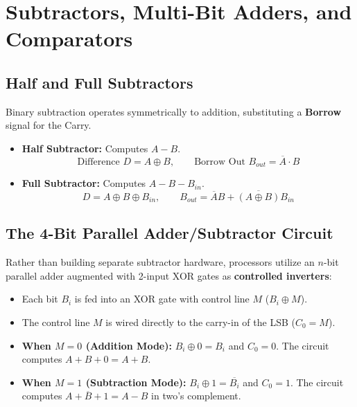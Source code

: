 \section{Subtractors, Multi-Bit Adders, and Comparators}
\label{sec:arithmetic_circuits}

\subsection{Half and Full Subtractors}
Binary subtraction operates symmetrically to addition, substituting a \textbf{Borrow} signal for the Carry.
\begin{itemize}
    \item \textbf{Half Subtractor:} Computes $A - B$.
    \begin{equation}
    \label{eq:half_subtractor}
    \text{Difference } D = A \oplus B, \qquad \text{Borrow Out } B_{out} = \overline{A} \cdot B
    \end{equation}
    \item \textbf{Full Subtractor:} Computes $A - B - B_{in}$.
    \begin{equation}
    \label{eq:full_subtractor}
    D = A \oplus B \oplus B_{in}, \qquad B_{out} = \overline{A}B + \overline{(A \oplus B)}B_{in}
    \end{equation}
\end{itemize}

\subsection{The 4-Bit Parallel Adder/Subtractor Circuit}
Rather than building separate subtractor hardware, processors utilize an $n$-bit parallel adder augmented with 2-input XOR gates as \textbf{controlled inverters}:
\begin{itemize}
    \item Each bit $B_i$ is fed into an XOR gate with control line $M$ ($B_i \oplus M$).
    \item The control line $M$ is wired directly to the carry-in of the LSB ($C_0 = M$).
    \item \textbf{When $M = 0$ (Addition Mode):} $B_i \oplus 0 = B_i$ and $C_0 = 0$. The circuit computes $A + B + 0 = A + B$.
    \item \textbf{When $M = 1$ (Subtraction Mode):} $B_i \oplus 1 = \overline{B_i}$ and $C_0 = 1$. The circuit computes $A + \overline{B} + 1 = A - B$ in two's complement.
\end{itemize}

